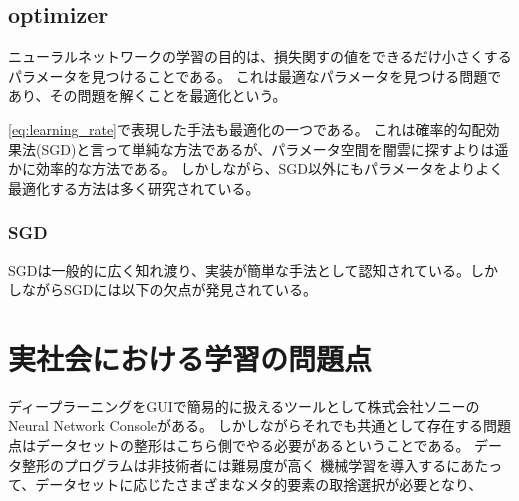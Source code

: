 \subsection{optimizer}
ニューラルネットワークの学習の目的は、損失関すの値をできるだけ小さくするパラメータを見つけることである。
これは最適なパラメータを見つける問題であり、その問題を解くことを最適化という。

\ref{eq:learning_rate}で表現した手法も最適化の一つである。
これは確率的勾配効果法(SGD)と言って単純な方法であるが、パラメータ空間を闇雲に探すよりは遥かに効率的な方法である。
しかしながら、SGD以外にもパラメータをよりよく最適化する方法は多く研究されている。

\subsubsection{SGD}
SGDは一般的に広く知れ渡り、実装が簡単な手法として認知されている。しかしながらSGDには以下の欠点が発見されている。



\section{実社会における学習の問題点}
ディープラーニングをGUIで簡易的に扱えるツールとして株式会社ソニーのNeural Network Consoleがある。
しかしながらそれでも共通として存在する問題点はデータセットの整形はこちら側でやる必要があるということである。
データ整形のプログラムは非技術者には難易度が高く
機械学習を導入するにあたって、データセットに応じたさまざまなメタ的要素の取捨選択が必要となり、
